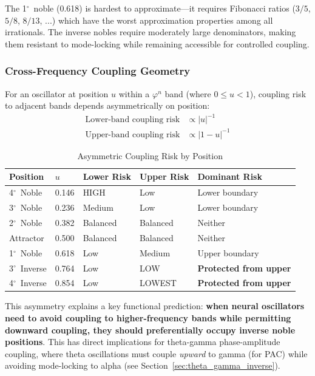 \documentclass[11pt,a4paper]{article}
\newcommand{\degree}{$^\circ$}  %
\newcommand{\phisym}{\varphi}
\begin{document}
The 1\degree\ noble (0.618) is hardest to approximate---it requires Fibonacci ratios ($3/5$, $5/8$, $8/13$, ...) which have the worst approximation properties among all irrationals. The inverse nobles require moderately large denominators, making them resistant to mode-locking while remaining accessible for controlled coupling.

\subsubsection{Cross-Frequency Coupling Geometry}
\label{sec:coupling_geometry}

For an oscillator at position $u$ within a $\phisym^n$ band (where $0 \leq u < 1$), coupling risk to adjacent bands depends asymmetrically on position:
\begin{align}
\text{Lower-band coupling risk} &\propto |u|^{-1} \\
\text{Upper-band coupling risk} &\propto |1-u|^{-1}
\end{align}

\begin{table}[H]
\centering
\caption{Asymmetric Coupling Risk by Position}
\label{tab:coupling_risk}
\begin{tabular}{@{}lllll@{}}
\toprule
Position & $u$ & Lower Risk & Upper Risk & Dominant Risk \\
\midrule
4\degree\ Noble & 0.146 & HIGH & Low & Lower boundary \\
3\degree\ Noble & 0.236 & Medium & Low & Lower boundary \\
2\degree\ Noble & 0.382 & Balanced & Balanced & Neither \\
Attractor & 0.500 & Balanced & Balanced & Neither \\
1\degree\ Noble & 0.618 & Low & Medium & Upper boundary \\
3\degree\ Inverse & 0.764 & Low & LOW & \textbf{Protected from upper} \\
4\degree\ Inverse & 0.854 & Low & LOWEST & \textbf{Protected from upper} \\
\bottomrule
\end{tabular}
\end{table}

This asymmetry explains a key functional prediction: \textbf{when neural oscillators need to avoid coupling to higher-frequency bands while permitting downward coupling, they should preferentially occupy inverse noble positions}. This has direct implications for theta-gamma phase-amplitude coupling, where theta oscillations must couple \textit{upward} to gamma (for PAC) while avoiding mode-locking to alpha (see Section~\ref{sec:theta_gamma_inverse}).
\end{document}
